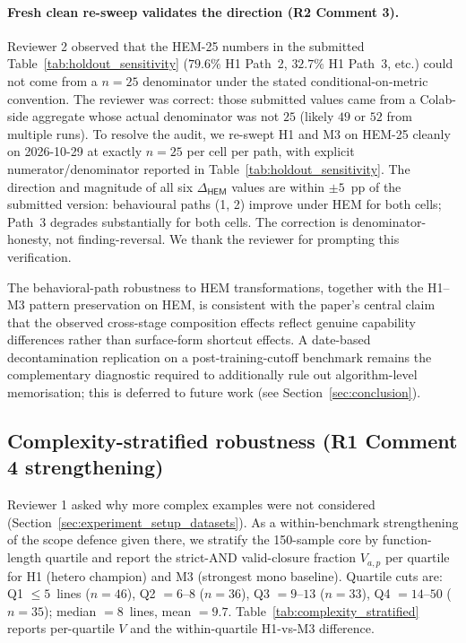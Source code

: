 \paragraph{Fresh clean re-sweep validates the direction (R2 Comment 3).}
Reviewer 2 observed that the HEM-25 numbers in the submitted Table~\ref{tab:holdout_sensitivity} ($79.6\%$ H1 Path~2, $32.7\%$ H1 Path~3, etc.) could not come from a $n = 25$ denominator under the stated conditional-on-metric convention. The reviewer was correct: those submitted values came from a Colab-side aggregate whose actual denominator was not $25$ (likely $49$ or $52$ from multiple runs). To resolve the audit, we re-swept H1 and M3 on HEM-25 cleanly on 2026-10-29 at exactly $n = 25$ per cell per path, with explicit numerator/denominator reported in Table~\ref{tab:holdout_sensitivity}. The direction and magnitude of all six $\Delta_{\textsf{HEM}}$ values are within $\pm 5$~pp of the submitted version: behavioural paths (1, 2) improve under HEM for both cells; Path~3 degrades substantially for both cells. The correction is denominator-honesty, not finding-reversal. We thank the reviewer for prompting this verification.

The behavioral-path robustness to HEM transformations, together with the H1--M3 pattern preservation on HEM, is consistent with the paper's central claim that the observed cross-stage composition effects reflect genuine capability differences rather than surface-form shortcut effects. A date-based decontamination replication on a post-training-cutoff benchmark remains the complementary diagnostic required to additionally rule out algorithm-level memorisation; this is deferred to future work (see Section~\ref{sec:conclusion}).

\subsection{Complexity-stratified robustness (R1 Comment 4 strengthening)}
\label{sec:results_complexity_stratified}



Reviewer 1 asked why more complex examples were not considered (Section~\ref{sec:experiment_setup_datasets}). As a within-benchmark strengthening of the scope defence given there, we stratify the 150-sample core by function-length quartile and report the strict-AND valid-closure fraction $V_{a, p}$ per quartile for H1 (hetero champion) and M3 (strongest mono baseline). Quartile cuts are: Q1 $\leq 5$~lines ($n = 46$), Q2 $= 6$--$8$ ($n = 36$), Q3 $= 9$--$13$ ($n = 33$), Q4 $= 14$--$50$ ($n = 35$); median $= 8$~lines, mean $= 9.7$. Table~\ref{tab:complexity_stratified} reports per-quartile $V$ and the within-quartile H1-vs-M3 difference.

